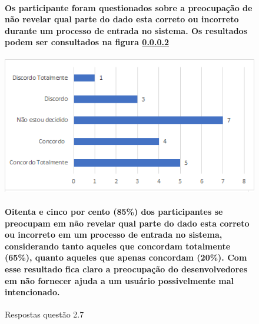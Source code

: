 \begin{figure}[!t]
\centering

\paragraph{
Os participante foram questionados sobre a preocupação de não revelar qual parte do dado esta correto ou incorreto durante um processo de entrada no sistema. Os resultados podem ser consultados na figura \ref{fig:2.7}
} 

\includegraphics[scale=0.7]{figuras das questoes/2.7.png}
\caption{Respostas questão 2.7}
\paragraph{
Oitenta e cinco por cento (85{\%}) dos participantes se preocupam em não revelar qual parte do dado esta correto ou incorreto em um processo de entrada no sistema, considerando tanto aqueles que concordam totalmente (65{\%}), quanto aqueles que apenas concordam (20{\%}). Com esse resultado fica claro a preocupação do desenvolvedores em não fornecer ajuda a um usuário possivelmente mal intencionado.
}
\label{fig:2.7}
\end{figure}
